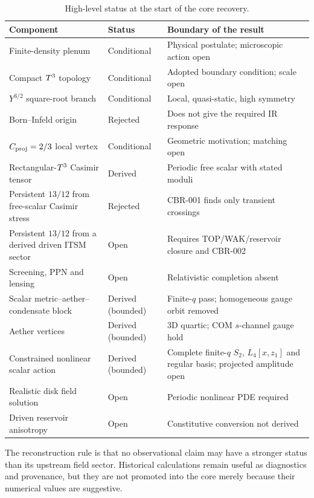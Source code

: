 \begin{table}[ht]
\centering
\small
\caption{High-level status at the start of the core recovery.}
\begin{tabular}{@{}p{}@{\hspace{0.8em}}p{}@{\hspace{0.8em}}p{}@{}}
\toprule
Component & Status & Boundary of the result \\
\midrule
Finite-density plenum & Conditional & Physical postulate; microscopic action open \\
Compact $T^3$ topology & Conditional & Adopted boundary condition; scale open \\
$Y^{3/2}$ square-root branch & Conditional & Local, quasi-static, high symmetry \\
Born--Infeld origin & Rejected & Does not give the required IR response \\
$C_{\mathrm{proj}}=2/3$ local vertex & Conditional & Geometric motivation; matching open \\
Rectangular-$T^3$ Casimir tensor & Derived & Periodic free scalar with stated moduli \\
Persistent $13/12$ from free-scalar Casimir stress & Rejected & CBR-001 finds only transient crossings \\
Persistent $13/12$ from a derived driven ITSM sector & Open & Requires TOP/WAK/reservoir closure and CBR-002 \\
Screening, PPN and lensing & Open & Relativistic completion absent \\
Scalar metric--aether--condensate block & Derived (bounded) & Finite-$q$ pass; homogeneous gauge orbit removed \\
Aether vertices & Derived (bounded) & 3D quartic; COM $s$-channel gauge hold \\
Constrained nonlinear scalar action & Derived (bounded) & Complete finite-$q$ $S_2$, $L_4[x,z_1]$ and regular basis; projected amplitude open \\
Realistic disk field solution & Open & Periodic nonlinear PDE required \\
Driven reservoir anisotropy & Open & Constitutive conversion not derived \\
\bottomrule
\end{tabular}
\end{table}

The reconstruction rule is that no observational claim may have a stronger
status than its upstream field sector.  Historical calculations remain useful
as diagnostics and provenance, but they are not promoted into the core merely
because their numerical values are suggestive.

